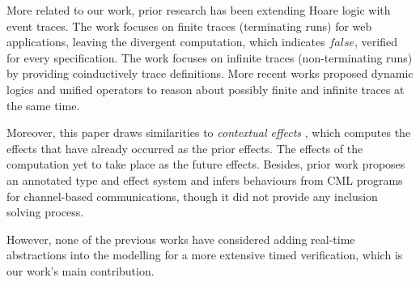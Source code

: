 \documentclass[acmsmall,10pt,review]{acmart}
\newcommand{\code}[1]{{\tt{\ensuremath{\m{#1}}}}}
\newcommand{\m}{\mathit}
\begin{document}
 
More related to our work, prior research has been extending Hoare logic with event traces. The work \cite{malecha2011trace} focuses on finite traces (terminating runs) for web applications, leaving the divergent computation, which indicates \code{false}, verified for every specification. The work \cite{nakata2010hoare} focuses on infinite traces (non-terminating runs) by providing coinductively trace definitions. 
More recent works \cite{bubel2015dynamic,song2020automated} proposed dynamic logics and unified operators to reason about possibly finite and infinite traces at the same time. 

Moreover, this paper draws similarities to \textit{contextual effects} \cite{neamtiu2008contextual}, which computes the effects that have already occurred as the prior effects. The effects of the computation yet to take place as the future effects. 
Besides, prior work \cite{nielson1998behaviour} proposes an annotated type and effect system and infers behaviours from CML \cite{reppy1993concurrent} programs for channel-based communications, though it did not provide any inclusion solving process. 



However, none of the previous works have considered adding real-time abstractions into the modelling for a more extensive timed verification, which is our work's main contribution.




 
%
%
%
%
%
 






%
%
\end{document}
